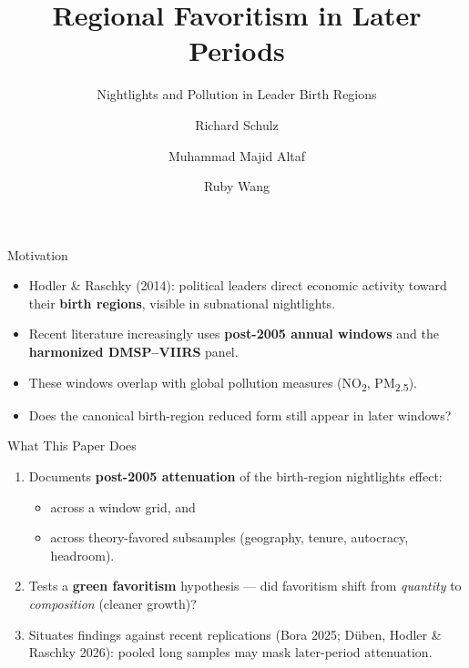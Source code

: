 \documentclass[10pt,aspectratio=169]{beamer}
\title{Regional Favoritism in Later Periods}
\subtitle{Nightlights and Pollution in Leader Birth Regions}
\author{Richard Schulz \and Muhammad Majid Altaf \and Ruby Wang}
\institute{University of California, Berkeley}
\date{} %
\begin{document}
\begin{frame}
  \titlepage
\end{frame}

\begin{frame}{Motivation}
\begin{itemize}
  \item Hodler \& Raschky (2014): political leaders direct economic activity toward their \textbf{birth regions}, visible in subnational nightlights.
  \item Recent literature increasingly uses \textbf{post-2005 annual windows} and the \textbf{harmonized DMSP--VIIRS} panel.
  \item These windows overlap with global pollution measures (NO\textsubscript{2}, PM\textsubscript{2.5}).
  \item[$\Rightarrow$] \alert{Does the canonical birth-region reduced form still appear in later windows?}
\end{itemize}
\end{frame}

\begin{frame}{What This Paper Does}
\begin{enumerate}
  \item Documents \textbf{post-2005 attenuation} of the birth-region nightlights effect:
  \begin{itemize}
    \item across a window grid, and
    \item across theory-favored subsamples (geography, tenure, autocracy, headroom).
  \end{itemize}
  \item Tests a \textbf{green favoritism} hypothesis --- did favoritism shift from \textit{quantity} to \textit{composition} (cleaner growth)?
  \item Situates findings against recent replications (Bora 2025; D\"uben, Hodler \& Raschky 2026): pooled long samples may mask later-period attenuation.
\end{enumerate}
\end{frame}
\end{document}

